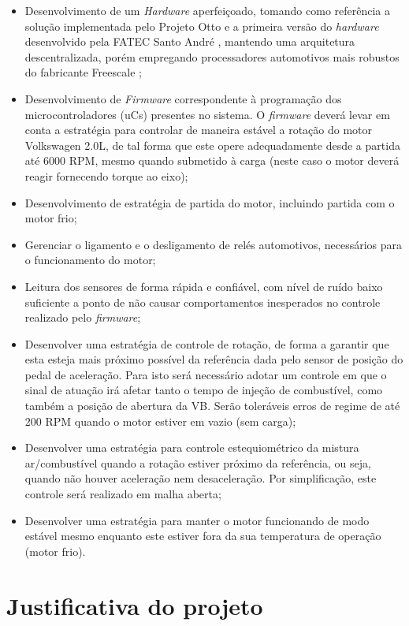 \begin{itemize}
	\item Desenvolvimento de um \textit{Hardware} aperfeiçoado, tomando como referência a solução implementada pelo Projeto Otto \cite{andre2012} e a primeira versão do \textit{hardware} desenvolvido pela FATEC Santo André \cite{bruno2011fatec}, mantendo uma arquitetura descentralizada, porém empregando processadores automotivos mais robustos do fabricante Freescale \cite{s12xe};
	\item Desenvolvimento de \textit{Firmware} correspondente à programação dos microcontroladores (uCs) presentes no sistema. O \textit{firmware} deverá levar em conta a estratégia para controlar de maneira estável a rotação do motor Volkswagen 2.0L, de tal forma que este opere adequadamente desde a partida até 6000 RPM, mesmo quando submetido à carga (neste caso o motor deverá reagir fornecendo torque ao eixo);
	\item Desenvolvimento de estratégia de partida do motor, incluindo partida com o motor frio;
	\item Gerenciar o ligamento e o desligamento de relés automotivos, necessários para o funcionamento do motor;
	\item Leitura dos sensores de forma rápida e confiável, com nível de ruído baixo suficiente a ponto de não causar comportamentos inesperados no controle realizado pelo \textit{firmware};
	\item Desenvolver uma estratégia de controle de rotação, de forma a garantir que esta esteja mais próximo possível da referência dada pelo sensor de posição do pedal de aceleração. Para isto será necessário adotar um controle em que o sinal de atuação irá afetar tanto o tempo de injeção de combustível, como também a posição de abertura da VB. Serão toleráveis erros de regime de até 200 RPM quando o motor estiver em vazio (sem carga);
	\item Desenvolver uma estratégia para controle estequiométrico da mistura ar/combustível quando a rotação estiver próximo da referência, ou seja, quando não houver aceleração nem desaceleração. Por simplificação, este controle será realizado em malha aberta;
	\item Desenvolver uma estratégia para manter o motor funcionando de modo estável mesmo enquanto este estiver fora da sua temperatura de operação (motor frio).
\end{itemize}

\section{Justificativa do projeto}

